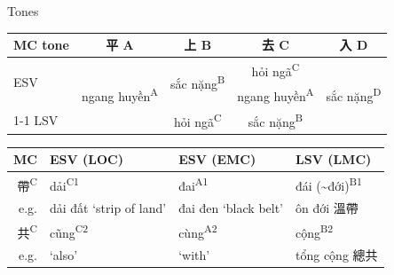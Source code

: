 \documentclass{beamer}
\begin{document}
\begin{frame}[fragile]{Tones}

\begin{tabular}{l|c c c c}
MC tone & 平 A & 上 B & 去 C & 入 D\\ \hline 
\multirow{2}{*}{ESV} & \multirow{3}{*}{ngang huyền\textsuperscript{A}} & \multirow{2}{*}{sắc nặng\textsuperscript{B}} & hỏi ngã\textsuperscript{C} & \multirow{3}{*}{sắc nặng\textsuperscript{D}}\\
 & & & ngang huyền\textsuperscript{A} & \\ \cline{1-1} \cline{3-4}
LSV & & hỏi ngã\textsuperscript{C} & sắc nặng\textsuperscript{B} & \\
\end{tabular}

\bigskip
\begin{tabular}{r|l l l}
MC & ESV (LOC) & ESV (EMC) & LSV (LMC)\\ \hline 
帶\textsuperscript{C} & dải\textsuperscript{C1} & đai\textsuperscript{A1} & đái (\~{}đới)\textsuperscript{B1}\\
e.g. & dải đất \enquote*{strip of land} & đai đen \enquote*{black belt} & ôn đới 溫帶\\ \hline
共\textsuperscript{C} & cũng\textsuperscript{C2} & cùng\textsuperscript{A2} & cộng\textsuperscript{B2}\\
e.g. & \enquote*{also} & \enquote*{with} & tổng cộng 總共\\

\end{tabular}
\end{frame}
\end{document}
